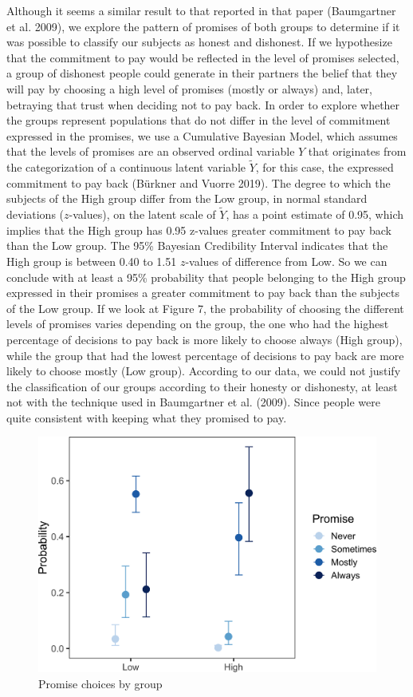 \documentclass[smallextended]{svjour3}       %
\begin{document}
Although it seems a similar result to that reported in that paper
(Baumgartner et al. 2009), we explore the pattern of promises of both
groups to determine if it was possible to classify our subjects as
honest and dishonest. If we hypothesize that the commitment to pay would
be reflected in the level of promises selected, a group of dishonest
people could generate in their partners the belief that they will pay by
choosing a high level of promises (mostly or always) and, later,
betraying that trust when deciding not to pay back. In order to explore
whether the groups represent populations that do not differ in the level
of commitment expressed in the promises, we use a Cumulative Bayesian
Model, which assumes that the levels of promises are an observed ordinal
variable \(Y\) that originates from the categorization of a continuous
latent variable \(\tilde{Y}\), for this case, the expressed commitment
to pay back (Bürkner and Vuorre 2019). The degree to which the subjects
of the High group differ from the Low group, in normal standard
deviations (\(z\)-values), on the latent scale of \(\tilde{Y}\), has a
point estimate of 0.95, which implies that the High group has 0.95
z-values greater commitment to pay back than the Low group. The 95\%
Bayesian Credibility Interval indicates that the High group is between
0.40 to 1.51 \(z\)-values of difference from Low. So we can conclude
with at least a 95\% probability that people belonging to the High group
expressed in their promises a greater commitment to pay back than the
subjects of the Low group. If we look at Figure 7, the probability of
choosing the different levels of promises varies depending on the group,
the one who had the highest percentage of decisions to pay back is more
likely to choose always (High group), while the group that had the
lowest percentage of decisions to pay back are more likely to choose
mostly (Low group). According to our data, we could not justify the
classification of our groups according to their honesty or dishonesty,
at least not with the technique used in Baumgartner et al. (2009). Since
people were quite consistent with keeping what they promised to pay.

\begin{figure}

{\centering \includegraphics[width=0.8\linewidth]{behavioral-promises_files/figure-latex/fig7-1} 

}

\caption{Promise choices by group}\label{fig:fig7}
\end{figure}
\end{document}
